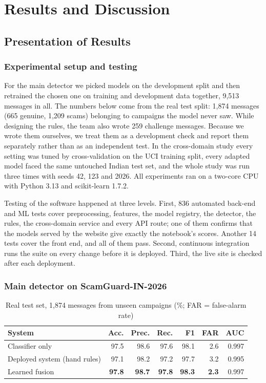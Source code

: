 \chapter{Results and Discussion}

\section{Presentation of Results}

\subsection{Experimental setup and testing}
For the main detector we picked models on the development split and then retrained the chosen one on training and development data together, 9,513 messages in all. The numbers below come from the real test split: 1,874 messages (665 genuine, 1,209 scams) belonging to campaigns the model never saw. While designing the rules, the team also wrote 259 challenge messages. Because we wrote them ourselves, we treat them as a development check and report them separately rather than as an independent test. In the cross-domain study every setting was tuned by cross-validation on the UCI training split, every adapted model faced the same untouched Indian test set, and the whole study was run three times with seeds 42, 123 and 2026. All experiments ran on a two-core CPU with Python 3.13 and scikit-learn 1.7.2.

Testing of the software happened at three levels. First, 836 automated back-end and ML tests cover preprocessing, features, the model registry, the detector, the rules, the cross-domain service and every API route; one of them confirms that the models served by the website give exactly the notebook's scores. Another 14 tests cover the front end, and all of them pass. Second, continuous integration runs the suite on every change before it is deployed. Third, the live site is checked after each deployment.

\subsection{Main detector on ScamGuard-IN-2026}
\begin{table}[H]
\centering
\caption{Real test set, 1,874 messages from unseen campaigns (\%; FAR = false-alarm rate)}
\label{tab:final}
\begin{tabular}{|l|r|r|r|r|r|r|}
\hline
\textbf{System} & \textbf{Acc.} & \textbf{Prec.} & \textbf{Rec.} & \textbf{F1} & \textbf{FAR} & \textbf{AUC} \\
\hline
Classifier only & 97.5 & 98.6 & 97.6 & 98.1 & 2.6 & 0.997 \\
\hline
Deployed system (hand rules) & 97.1 & 98.2 & 97.2 & 97.7 & 3.2 & 0.995 \\
\hline
Learned fusion & \textbf{97.8} & \textbf{98.7} & \textbf{97.8} & \textbf{98.3} & \textbf{2.3} & 0.997 \\
\hline
\end{tabular}
\end{table}

